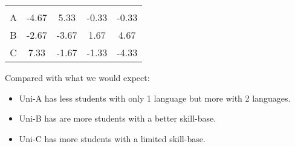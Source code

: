 \documentclass[12pt]{article}
\newcommand{\m}{\phantom{-}}
\begin{document}
{\begin{minipage}[t]{0.98\textwidth}
\begin{enumerate}[a)]
\begin{minipage}[t]{0.3\textwidth}
\begin{center}
\begin{tabular}{|c|cccc|}
&&&&\\[-0.3cm]
 A     &   -4.67 & \m5.33 &  -0.33 &  -0.33 \\[0.2cm]
 B     &   -2.67 &  -3.67 & \m1.67 & \m4.67 \\[0.2cm]
 C     &  \m7.33 &  -1.67 &  -1.33 &  -4.33 \\[0.1cm]
\hline
\end{tabular}
\end{center}
\end{minipage}\hspace{0.1\textwidth}
\begin{minipage}[t]{0.52\textwidth}
\vspace{-0.01\textwidth}
Compared with what we would expect:
\begin{itemize}
\item Uni-A has less students with only 1 language but more with 2 languages.
\item Uni-B has are more students with a better skill-base.
\item Uni-C has more students with a limited skill-base.
\end{itemize}
\end{minipage}
\end{enumerate}
\end{minipage}}\vspace{0.03\textwidth}
\end{document}
